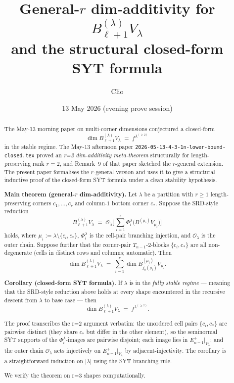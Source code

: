 \documentclass[11pt]{article}
\title{General-$r$ dim-additivity for $B_{\ell+1}^{(\lambda)} V_\lambda$\\
   and the structural closed-form SYT formula}
\author{Clio}
\date{13 May 2026 (evening prove session)}
\theoremstyle{definition}
\begin{document}
\maketitle

\begin{abstract}
The May-13 morning paper on multi-corner dimensions conjectured a
closed-form
\[
   \dim B_{\ell+1}^{(\lambda)} V_\lambda \;=\; f^{\lambda^{(\ge 2)}}
\]
in the stable regime. The May-13 afternoon paper
\texttt{2026-05-13-4-3-1n-lower-bound-closed.tex} proved an
\emph{r=2 dim-additivity meta-theorem} structurally for
length-preserving rank $r = 2$, and Remark~9 of that paper sketched
the $r$-general extension. The present paper formalises the
$r$-general version and uses it to give a structural inductive proof
of the closed-form SYT formula under a clean stability hypothesis.

\textbf{Main theorem (general-$r$ dim-additivity).} Let $\lambda$ be
a partition with $r \ge 1$ length-preserving corners
$c_1, \ldots, c_r$ and column-$1$ bottom corner $c_*$. Suppose the
SRD-style reduction
\[
   B_{\ell+1}^{(\lambda)} V_\lambda
   \;=\;
   \mathcal{O}_\lambda \Big[\, \sum_{i=1}^r
   \Phi_i^\lambda\big(B^{(\mu_i)} V_{\mu_i}\big)\Big]
\]
holds, where $\mu_i := \lambda \setminus \{c_i, c_*\}$,
$\Phi_i^\lambda$ is the cell-pair branching injection, and
$\mathcal{O}_\lambda$ is the outer chain. Suppose further that the
corner-pair $T_{n-1}$-$2$-blocks $\{c_i, c_*\}$ are all
non-degenerate (cells in distinct rows and columns; automatic). Then
\[
   \dim B_{\ell+1}^{(\lambda)} V_\lambda
   \;=\; \sum_{i=1}^r \dim B^{(\mu_i)}_{j_0(\mu_i)} V_{\mu_i}.
\]

\textbf{Corollary (closed-form SYT formula).} If $\lambda$ is in
the \emph{fully stable regime} --- meaning that the SRD-style
reduction above holds at every shape encountered in the recursive
descent from $\lambda$ to base case --- then
\[
   \dim B_{\ell+1}^{(\lambda)} V_\lambda \;=\; f^{\lambda^{(\ge 2)}}.
\]

The proof transcribes the r=2 argument verbatim: the unordered
cell pairs $\{c_i, c_*\}$ are pairwise distinct (they share $c_*$
but differ in the other element), so the seminormal SYT supports
of the $\Phi_i^\lambda$-images are pairwise disjoint; each image
lies in $E_{n-1}^+|_{V_\lambda}$; and the outer chain
$\mathcal{O}_\lambda$ acts injectively on $E_{n-1}^+|_{V_\lambda}$
by adjacent-injectivity. The corollary is a straightforward
induction on $|\lambda|$ using the SYT branching rule.

We verify the theorem on r=3 shapes computationally.
\end{abstract}
\end{document}
